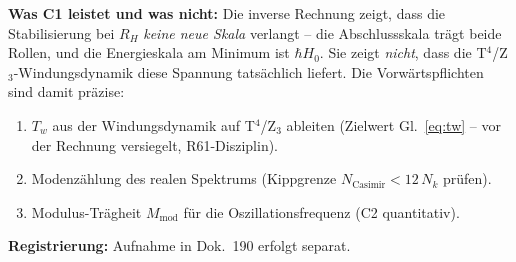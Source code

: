 \medskip
\noindent\textbf{Was C1 leistet und was nicht:} Die inverse Rechnung
zeigt, dass die Stabilisierung bei $R_H$ \emph{keine neue Skala}
verlangt -- die Abschlussskala trägt beide Rollen, und die
Energieskala am Minimum ist $\hbar H_0$. Sie zeigt \emph{nicht},
dass die T$^4$/Z$_3$-Windungsdynamik diese Spannung tatsächlich
liefert. Die Vorwärtspflichten sind damit präzise:

\begin{enumerate}
  \item $T_w$ aus der Windungsdynamik auf T$^4$/Z$_3$ ableiten
        (Zielwert Gl.~\eqref{eq:tw} -- vor der Rechnung versiegelt,
        R61-Disziplin).
  \item Modenzählung des realen Spektrums (Kippgrenze
        $N_\text{Casimir} < 12\,N_k$ prüfen).
  \item Modulus-Trägheit $M_\text{mod}$ für die
        Oszillationsfrequenz (C2 quantitativ).
\end{enumerate}

\noindent\textbf{Registrierung:} Aufnahme in Dok.~190 erfolgt
separat.



